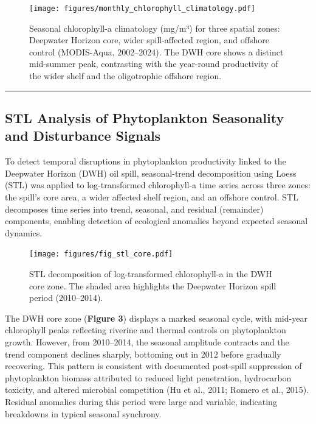 \documentclass[
  11pt,
]{article}
\begin{document}
\begin{figure}[H]

{\centering \texttt{[image: figures/monthly\_chlorophyll\_climatology.pdf]}

}

\caption{Seasonal chlorophyll-a climatology (mg/m³) for three spatial
zones: Deepwater Horizon core, wider spill-affected region, and offshore
control (MODIS-Aqua, 2002--2024). The DWH core shows a distinct
mid-summer peak, contrasting with the year-round productivity of the
wider shelf and the oligotrophic offshore region.}

\end{figure}%

\begin{center}\rule{0.5\linewidth}{0.5pt}\end{center}

\subsection{STL Analysis of Phytoplankton Seasonality and Disturbance
Signals}\label{stl-analysis-of-phytoplankton-seasonality-and-disturbance-signals}

To detect temporal disruptions in phytoplankton productivity linked to
the Deepwater Horizon (DWH) oil spill, seasonal-trend decomposition
using Loess (STL) was applied to log-transformed chlorophyll-a time
series across three zones: the spill's core area, a wider affected shelf
region, and an offshore control. STL decomposes time series into trend,
seasonal, and residual (remainder) components, enabling detection of
ecological anomalies beyond expected seasonal dynamics.

\begin{figure}[H]

{\centering \texttt{[image: figures/fig\_stl\_core.pdf]}

}

\caption{STL decomposition of log-transformed chlorophyll-a in the DWH
core zone. The shaded area highlights the Deepwater Horizon spill period
(2010--2014).}

\end{figure}%

The DWH core zone (\textbf{Figure 3}) displays a marked seasonal cycle,
with mid-year chlorophyll peaks reflecting riverine and thermal controls
on phytoplankton growth. However, from 2010--2014, the seasonal
amplitude contracts and the trend component declines sharply, bottoming
out in 2012 before gradually recovering. This pattern is consistent with
documented post-spill suppression of phytoplankton biomass attributed to
reduced light penetration, hydrocarbon toxicity, and altered microbial
competition (Hu et al., 2011; Romero et al., 2015). Residual anomalies
during this period were large and variable, indicating breakdowns in
typical seasonal synchrony.
\end{document}
